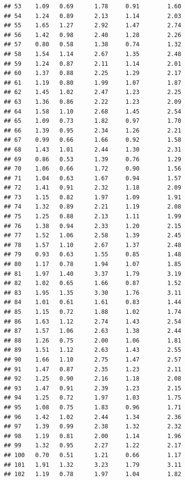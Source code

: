 \documentclass[
]{book}
\theoremstyle{definition}
\theoremstyle{definition}
\theoremstyle{definition}
\theoremstyle{definition}
\theoremstyle{remark}
\begin{document}
\begin{verbatim}
## 53    1.09   0.69      1.78     0.91        1.60
## 54    1.24   0.89      2.13     1.14        2.03
## 55    1.65   1.27      2.92     1.47        2.74
## 56    1.42   0.98      2.40     1.28        2.26
## 57    0.80   0.58      1.38     0.74        1.32
## 58    1.54   1.14      2.67     1.35        2.48
## 59    1.24   0.87      2.11     1.14        2.01
## 60    1.37   0.88      2.25     1.29        2.17
## 61    1.19   0.80      1.99     1.07        1.87
## 62    1.45   1.02      2.47     1.23        2.25
## 63    1.36   0.86      2.22     1.23        2.09
## 64    1.58   1.10      2.68     1.45        2.54
## 65    1.09   0.73      1.82     0.97        1.70
## 66    1.39   0.95      2.34     1.26        2.21
## 67    0.99   0.66      1.66     0.92        1.58
## 68    1.43   1.01      2.44     1.30        2.31
## 69    0.86   0.53      1.39     0.76        1.29
## 70    1.06   0.66      1.72     0.90        1.56
## 71    1.04   0.63      1.67     0.94        1.57
## 72    1.41   0.91      2.32     1.18        2.09
## 73    1.15   0.82      1.97     1.09        1.91
## 74    1.32   0.89      2.21     1.19        2.08
## 75    1.25   0.88      2.13     1.11        1.99
## 76    1.38   0.94      2.33     1.20        2.15
## 77    1.52   1.06      2.58     1.39        2.45
## 78    1.57   1.10      2.67     1.37        2.48
## 79    0.93   0.63      1.55     0.85        1.48
## 80    1.17   0.78      1.94     1.07        1.85
## 81    1.97   1.40      3.37     1.79        3.19
## 82    1.02   0.65      1.66     0.87        1.52
## 83    1.95   1.35      3.30     1.76        3.11
## 84    1.01   0.61      1.61     0.83        1.44
## 85    1.15   0.72      1.88     1.02        1.74
## 86    1.63   1.12      2.74     1.43        2.54
## 87    1.57   1.06      2.63     1.38        2.44
## 88    1.26   0.75      2.00     1.06        1.81
## 89    1.51   1.12      2.63     1.43        2.55
## 90    1.66   1.10      2.75     1.47        2.57
## 91    1.47   0.87      2.35     1.23        2.11
## 92    1.25   0.90      2.16     1.18        2.08
## 93    1.47   0.91      2.39     1.23        2.15
## 94    1.25   0.72      1.97     1.03        1.75
## 95    1.08   0.75      1.83     0.96        1.71
## 96    1.42   1.02      2.44     1.34        2.36
## 97    1.39   0.99      2.38     1.32        2.32
## 98    1.19   0.81      2.00     1.14        1.96
## 99    1.32   0.95      2.27     1.22        2.17
## 100   0.70   0.51      1.21     0.66        1.17
## 101   1.91   1.32      3.23     1.79        3.11
## 102   1.19   0.78      1.97     1.04        1.82

\end{verbatim}
\end{document}
